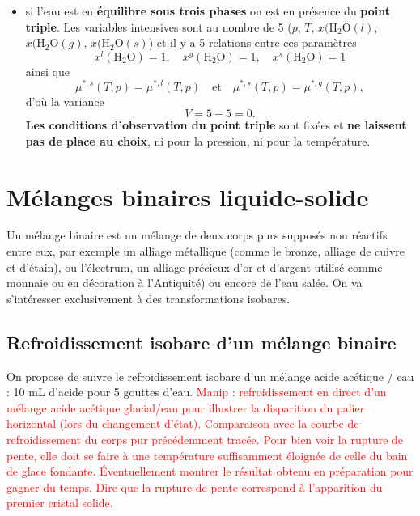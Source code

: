 \documentclass[11pt,a4paper]{report}
\begin{document}
\begin{itemize}
	\item si l'eau est en \textbf{équilibre sous trois phases} on est en présence du \textbf{point triple}. Les variables intensives sont au nombre de 5 ($p$, $T$, $x(\text{H}_2\text{O}(l)$, 
$x(\text{H}_2\text{O}(g)$, $x(\text{H}_2\text{O}(s)$) et il y a 5 relations entre ces paramètres
	\begin{equation}
		x^l(\text{H}_2\text{O}) = 1,\quad x^g(\text{H}_2\text{O}) = 1,
		\quad x^s(\text{H}_2\text{O}) = 1
	\end{equation}
	ainsi que
	\begin{equation}
		\mu^{*,s}(T,p) = \mu^{*,l}(T,p)\quad\text{et}\quad \mu^{*,s}(T,p) = \mu^{*,g}(T,p),
	\end{equation}
	d'où la variance
	\begin{equation}
		V = 5 - 5 = 0.
	\end{equation}
	\textbf{Les conditions d'observation du point triple} sont fixées et \textbf{ne laissent pas de 		place au choix}, ni pour la pression, ni pour la température.
\end{itemize}

\section{Mélanges binaires liquide-solide}

Un mélange binaire est un mélange de deux corps purs supposés non réactifs entre eux, par exemple un alliage métallique (comme le bronze, alliage de cuivre et d'étain), ou l'électrum, un alliage précieux d'or et d'argent utilisé comme monnaie ou en décoration à l'Antiquité) ou encore de l'eau salée. On va s'intéresser exclusivement à des transformations isobares.

\subsection{Refroidissement isobare d'un mélange binaire}

On propose de suivre le refroidissement isobare d'un mélange acide acétique / eau : 10 mL d'acide pour 5 gouttes d'eau. \textcolor{red}{Manip : refroidissement en direct d'un mélange acide acétique glacial/eau pour illustrer la disparition du palier horizontal (lors du changement d'état). Comparaison avec la courbe de refroidissement du corps pur précédemment tracée. Pour bien voir la rupture de pente, elle doit se faire à une température suffisamment éloignée de celle du bain de glace fondante. Éventuellement montrer le résultat obtenu en préparation pour gagner du temps. Dire que la rupture de pente correspond à l'apparition du premier cristal solide.}
\end{document}
